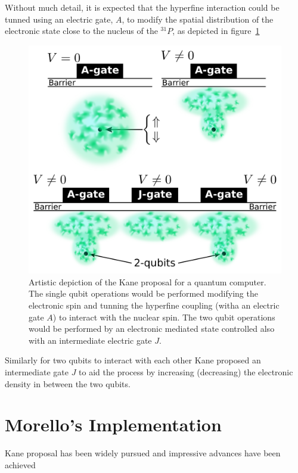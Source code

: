 Without much detail, it is expected that the hyperfine interaction could be tunned using an electric gate, $A$, to modify the spatial distribution of the electronic state close to the nucleus of the $^{31}P$, as depicted in figure~\ref{kane}
\begin{figure}[h!]
\centering
\includegraphics{chapter03/figures/kane.pdf}
\vspace{-5pt}
\caption{Artistic depiction of the Kane proposal for a quantum computer. The single qubit operations would be performed modifying the electronic spin and tunning the hyperfine coupling (witha an electric gate $A$) to interact with the nuclear spin. The two qubit operations would be performed by an electronic mediated state controlled also with an intermediate electric gate $J$.}
\label{kane}
\end{figure}
\FloatBarrier
Similarly for two qubits to interact with each other Kane proposed an intermediate gate $J$ to aid the process by increasing (decreasing) the electronic density in between the two qubits.


\section{Morello's Implementation}
Kane proposal has been widely pursued and impressive advances have been achieved


